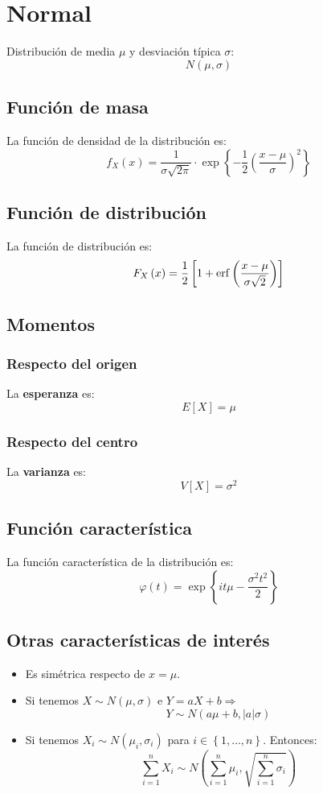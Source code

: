 \section{Normal}
\label{sec:normal}
Distribución de media $\mu$ y desviación típica $\sigma$:
\[
\boxed{N\left( \mu, \sigma \right)}
\]

\subsection{Función de masa}
La función de densidad de la distribución es:
\[
f_X \left( x \right) = \frac{1}{\sigma \sqrt{2 \pi}} \cdot \exp\left\{ -\frac{1}{2} \left( \frac{x - \mu}{\sigma} \right)^2 \right\}
\]

\subsection{Función de distribución}
La función de distribución es:
\[
F_X\left( x \right) = \frac{1}{2} \left[ 1 + \operatorname{erf}\left( \frac{x - \mu}{\sigma \sqrt{2}} \right) \right]
\]

\subsection{Momentos}

\subsubsection*{Respecto del origen}
La \textbf{esperanza} es: 
\[
    E\left[ X \right] = \mu
\]
\subsubsection*{Respecto del centro}
La \textbf{varianza} es:
\[
    V\left[ X \right] = \sigma^2
\]

\subsection{Función característica}
La función característica de la distribución es:
\[
\varphi\left( t \right) = \exp\left\{ it \mu - \frac{\sigma^2 t^2}{2} \right\}
\]

\subsection{Otras características de interés}
\begin{itemize}
    \item Es simétrica respecto de $x = \mu$.
    \item Si tenemos $X \sim N\left( \mu, \sigma \right)$ e $Y = aX + b \Rightarrow$
    \[
    Y \sim N\left( a \mu + b, \lvert a \rvert \sigma \right)
    \]
    \item Si tenemos $X_i \sim N\left( \mu_i, \sigma_i \right)$ para $i \in \left\{ 1, \ldots, n \right\}$. Entonces: 
    \[
    \sum_{i=1}^{n} X_i \sim N\left( \sum_{i=1}^{n} \mu_i, \sqrt{\sum_{i=1}^{n} \sigma_i} \right)  
    \]
\end{itemize}
